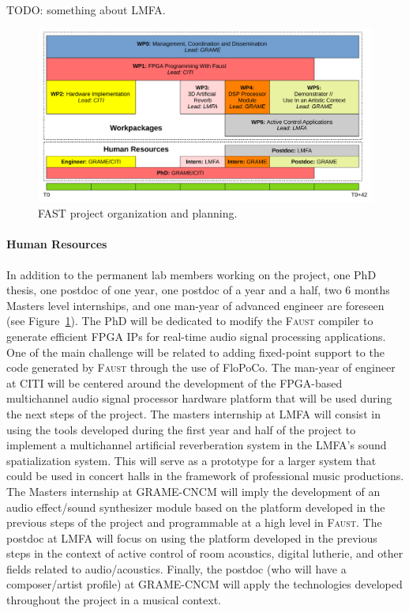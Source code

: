 \documentclass[a4paper,10pt]{article}
\newcommand{\F}{\textsc{Faust}}
\newcommand{\PP}{FAST}
\begin{document}
TODO: something about LMFA.

\begin{figure}[h]
  \centering
  \includegraphics[width=\columnwidth]{img/wp}
  \caption{\PP{} project organization and planning.}
  \label{fig:wp}
\end{figure}

\paragraph{Human Resources}

In addition to the permanent lab members working on the project, one PhD thesis, one postdoc of one year, one postdoc of a year and a half, two 6 months Masters level internships, and one man-year of advanced engineer are foreseen (see Figure~\ref{fig:wp}). The PhD will be dedicated to modify the \F{} compiler to generate efficient FPGA IPs for real-time audio signal processing applications. One of the main challenge will be related to adding fixed-point support to the code generated by \F{} through the use of FloPoCo. The man-year of engineer at CITI will be centered around the development of the FPGA-based multichannel audio signal processor hardware platform that will be used during the next steps of the project. The masters internship at LMFA will consist in using the tools developed during the first year and half of the project to implement a multichannel artificial reverberation system in the LMFA's sound spatialization system. This will serve as a prototype for a larger system that could be used in concert halls in the framework of professional music productions. The Masters internship at GRAME-CNCM will imply the development of an audio effect/sound synthesizer module based on the platform developed in the previous steps of the project and programmable at a high level in \F{}. The postdoc at LMFA will focus on using the platform developed in the previous steps in the context of active control of room acoustics, digital lutherie, and other fields related to audio/acoustics. Finally, the postdoc (who will have a composer/artist profile) at GRAME-CNCM will apply the technologies developed throughout the project in a musical context.
\end{document}
